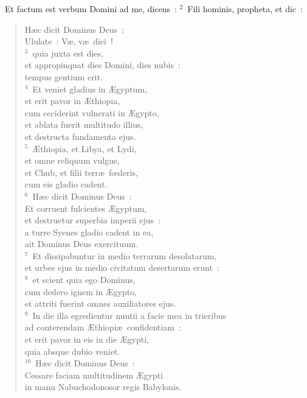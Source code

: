 ~Et factum est verbum Domini ad me, dicens~:
${}^{2}$~Fili hominis, propheta, et dic~: \begin{flushleft}\begin{verse}H\ae c dicit Dominus Deus~:\\ Ululate~: V\ae , v\ae\ diei~!\\
${}^{3}$~quia juxta est dies,\\ et appropinquat dies Domini, dies nubis~:\\ tempus gentium erit.\\
${}^{4}$~Et veniet gladius in \AE gyptum,\\ et erit pavor in \AE thiopia,\\ cum ceciderint vulnerati in \AE gypto,\\ et ablata fuerit multitudo illius,\\ et destructa fundamenta ejus.\\
${}^{5}$~\AE thiopia, et Libya, et Lydi,\\ et omne reliquum vulgus,\\ et Chub, et filii terr\ae\ fœderis,\\ cum eis gladio cadent.\\
${}^{6}$~H\ae c dicit Dominus Deus~:\\ Et corruent fulcientes \AE gyptum,\\ et destruetur superbia imperii ejus~:\\ a turre Syenes gladio cadent in ea,\\ ait Dominus Deus exercituum.\\
${}^{7}$~Et dissipabuntur in medio terrarum desolatarum,\\ et urbes ejus in medio civitatum desertarum erunt~:\\
${}^{8}$~et scient quia ego Dominus,\\ cum dedero ignem in \AE gypto,\\ et attriti fuerint omnes auxiliatores ejus.\\
${}^{9}$~In die illa egredientur nuntii a facie mea in trieribus\\ ad conterendam \AE thiopi\ae\ confidentiam~:\\ et erit pavor in eis in die \AE gypti,\\ quia absque dubio veniet.\\
${}^{10}$~H\ae c dicit Dominus Deus~:\\ Cessare faciam multitudinem \AE gypti\\ in manu Nabuchodonosor regis Babylonis.\\

\end{verse}
\end{flushleft}

